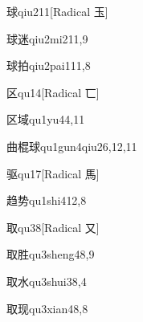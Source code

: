 \begin{verbete}{球}{qiu2}{11}[Radical 玉]
\end{verbete}

\begin{verbete}{球迷}{qiu2mi2}{11,9}
\end{verbete}

\begin{verbete}{球拍}{qiu2pai1}{11,8}
\end{verbete}

\begin{verbete}{区}{qu1}{4}[Radical 匸]
\end{verbete}

\begin{verbete}{区域}{qu1yu4}{4,11}
\end{verbete}

\begin{verbete}{曲棍球}{qu1gun4qiu2}{6,12,11}
\end{verbete}

\begin{verbete}{驱}{qu1}{7}[Radical 馬]
\end{verbete}

\begin{verbete}{趋势}{qu1shi4}{12,8}
\end{verbete}

\begin{verbete}{取}{qu3}{8}[Radical 又]
\end{verbete}

\begin{verbete}{取胜}{qu3sheng4}{8,9}
\end{verbete}

\begin{verbete}{取水}{qu3shui3}{8,4}
\end{verbete}

\begin{verbete}{取现}{qu3xian4}{8,8}
\end{verbete}

